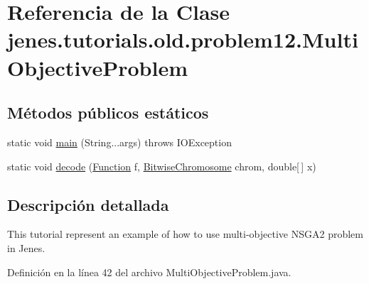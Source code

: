 \hypertarget{classjenes_1_1tutorials_1_1old_1_1problem12_1_1_multi_objective_problem}{\section{Referencia de la Clase jenes.\-tutorials.\-old.\-problem12.\-Multi\-Objective\-Problem}
\label{classjenes_1_1tutorials_1_1old_1_1problem12_1_1_multi_objective_problem}
}
\subsection*{Métodos públicos estáticos}
\begin{DoxyCompactItemize}
\item 
static void \hyperlink{classjenes_1_1tutorials_1_1old_1_1problem12_1_1_multi_objective_problem_aa56b8e189215e753714d1ed16fdf1075}{main} (String...\-args)  throws I\-O\-Exception 
\item 
static void \hyperlink{classjenes_1_1tutorials_1_1old_1_1problem12_1_1_multi_objective_problem_a793287d33c3ae22a258312881dbed2a3}{decode} (\hyperlink{classjenes_1_1tutorials_1_1old_1_1problem12_1_1_function}{Function} f, \hyperlink{classjenes_1_1chromosome_1_1_bitwise_chromosome}{Bitwise\-Chromosome} chrom, double\mbox{[}$\,$\mbox{]} x)
\end{DoxyCompactItemize}


\subsection{Descripción detallada}
This tutorial represent an example of how to use multi-\/objective N\-S\-G\-A2 problem in Jenes. 

Definición en la línea 42 del archivo Multi\-Objective\-Problem.\-java.



